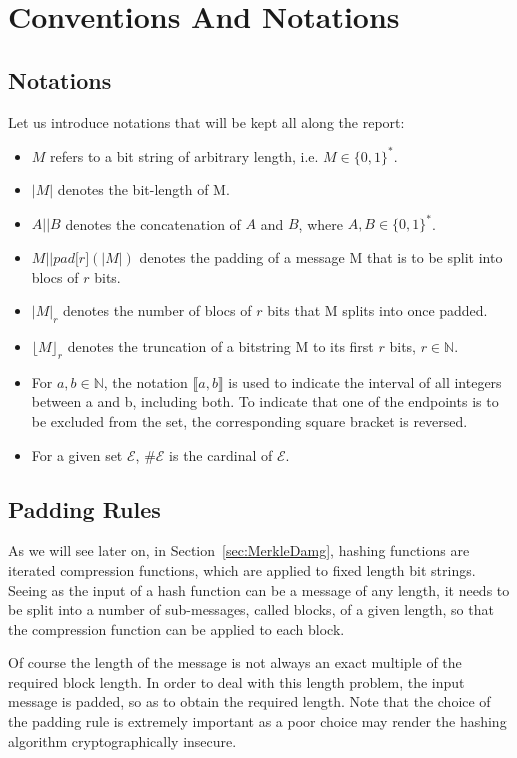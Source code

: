 \chapter{Conventions And Notations}
\section{Notations}
Let us introduce notations that will be kept all along the report:
\begin{itemize}
  \item $M$ refers to a bit string of arbitrary length, i.e. $M \in {\{0,1\}}^*$.
  \item $\vert M\vert$ denotes the bit-length of M.
  \item $A\vert \vert B$ denotes the concatenation of $A$ and $B$, where $A, B \in {\{0,1\}}^*$.
  \item $ M\vert \vert pad\lbrack r\rbrack (\vert M\vert )$ denotes the padding of a message M that is to be split into blocs of $r$ bits.
  \item $\vert M\vert_r$ denotes the number of blocs  of $r$ bits that M splits into once padded.
  \item $\lfloor M\rfloor_r$ denotes the truncation of a bitstring M to its first $r$ bits, $r\in \mathbb{N}$.
  \item For $a, b \in \mathbb{N}$, the notation  $\llbracket a,b \rrbracket$ is used to indicate the interval of all integers between a and b, including both. To indicate that one of the endpoints is to be excluded from the set, the corresponding square bracket is reversed.
  \item For a given set $\mathcal{E}$, $\# \mathcal{E}$ is the cardinal of $\mathcal{E}$.
\end{itemize}

\section{Padding Rules}\label{section:padding}

As we will see later on, in Section~\ref{sec:MerkleDamg}, hashing functions are iterated compression functions, which are applied to fixed length bit strings.
Seeing as the input of a hash function can be a message of any length,
it needs to be split into a number of sub-messages, called blocks, of a given length, so that the compression function can be applied to each block.

Of course the length of the message is not always an exact multiple of the required block length. 
In order to deal with this length problem, the input message is padded, so as to obtain the required length.
Note that the choice of the padding rule is extremely important as a poor choice may render the hashing algorithm cryptographically insecure.

